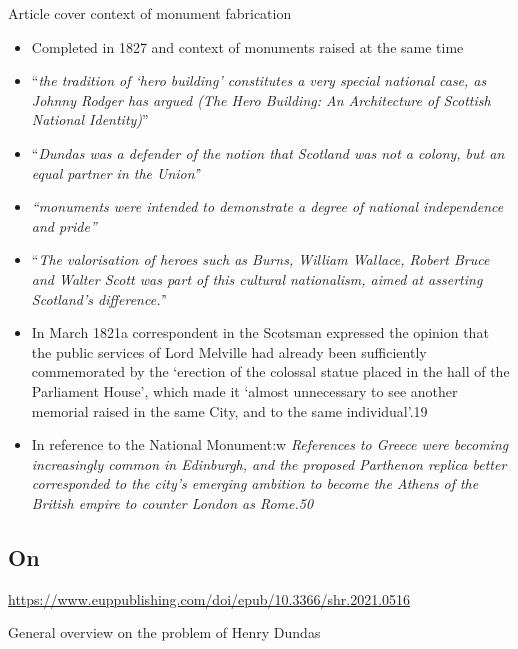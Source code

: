 \documentclass{scrartcl}
\begin{document}
Article cover context of monument fabrication
\begin{itemize}
    \item Completed in 1827 and context of monuments raised at the same time
    \item ``\textit{the tradition of ‘hero building’ constitutes a very special national case, as Johnny Rodger has argued (The Hero Building: An Architecture of Scottish National Identity)}''
    \item ``\textit{Dundas was a defender of the notion that Scotland was not a colony, but an equal partner in the Union'}'
    \item \textit{``monuments were intended to demonstrate a degree of national independence and pride''}
    \item ``\textit{The valorisation of heroes such as Burns, William Wallace, Robert Bruce and Walter Scott was part of this cultural nationalism, aimed at asserting Scotland’s difference.'}'
    \item In March 1821a correspondent in the Scotsman expressed the opinion that the public services of Lord Melville had already been sufficiently commemorated by the ‘erection of the colossal statue placed in the hall of the Parliament House’, which made it ‘almost unnecessary to see another memorial raised in the same City, and to the same individual’.19 
    \item In reference to the National Monument:w \textit{References to Greece were becoming increasingly common in Edinburgh, and the proposed Parthenon replica better corresponded to the city’s emerging ambition to become the Athens of the British empire to counter London as Rome.50}
\end{itemize}

\subsection{On \cite{mullen_2021}}

\url{https://www.euppublishing.com/doi/epub/10.3366/shr.2021.0516}

General overview on the problem of Henry Dundas
 
\end{document}
